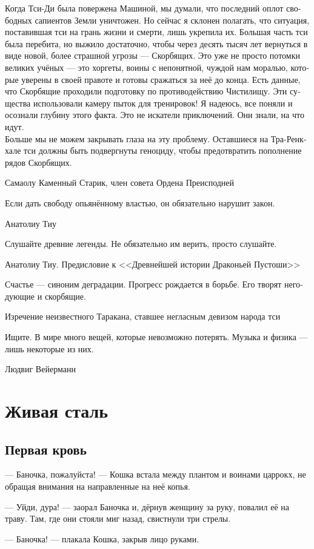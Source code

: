 \documentclass[a4paper,12pt,fleqn]{book}\usepackage{cooltooltips}\usepackage{polyglossia}\setdefaultlanguage[babelshorthands=true]{russian}\setotherlanguage{english}\defaultfontfeatures{Ligatures=TeX,Mapping=tex-text} \usepackage{xcolor}\definecolor{lightgray}{HTML}{bbbbbb}\color{lightgray}\newcommand{\ml}[3]{\textenglish{\textcolor{black}{#3}}}
\begin{document}
{\epigraph
{Когда Тси-Ди была повержена Машиной, мы думали, что последний оплот свободных сапиентов Земли уничтожен.
Но сейчас я склонен полагать, что ситуация, поставившая тси на грань жизни и смерти, лишь укрепила их.
Большая часть тси была перебита, но выжило достаточно, чтобы через десять тысяч лет вернуться в виде новой, более страшной угрозы --- Скорбящих.
Это уже не просто потомки великих учёных --- это хоргеты, воины с непонятной, чуждой нам моралью, которые уверены в своей правоте и готовы сражаться за неё до конца.
Есть данные, что Скорбящие проходили подготовку по противодействию Чистилищу.
Эти существа использовали камеру пыток для тренировок!
Я надеюсь, все поняли и осознали глубину этого факта.
Это не искатели приключений.
Они знали, на что идут.\\
Больше мы не можем закрывать глаза на эту проблему.
Оставшиеся на Тра-Ренкхале тси должны быть подвергнуты геноциду, чтобы предотвратить пополнение рядов Скорбящих.}
{Самаолу Каменный Старик, член совета Ордена Преисподней}

\epigraph
{Если дать свободу опьянённому властью, он обязательно нарушит закон.}
{Анатолиу Тиу}

\epigraph
{Слушайте древние легенды.
Не обязательно им верить, просто слушайте.}
{Анатолиу Тиу.
Предисловие к <<Древнейшей истории Драконьей Пустоши>>}

\epigraph{Счастье --- синоним деградации.
Прогресс рождается в борьбе.
Его творят негодующие и скорбящие.}
{Изречение неизвестного Таракана, ставшее негласным девизом народа тси}

\epigraph{Ищите.
В мире много вещей, которые невозможно потерять.
Музыка и физика --- лишь некоторые из них.}
{Людвиг Вейерманн}

\chapter{Живая сталь}

\section{Первая кровь}

--- Баночка, пожалуйста! --- Кошка встала между плантом и воинами царрокх, не обращая внимания на направленные на неё копья.

--- Уйди, дура! --- заорал Баночка и, дёрнув женщину за руку, повалил её на траву.
Там, где они стояли миг назад, свистнули три стрелы.

--- Баночка! --- плакала Кошка, закрыв лицо руками.

}
\end{document}
